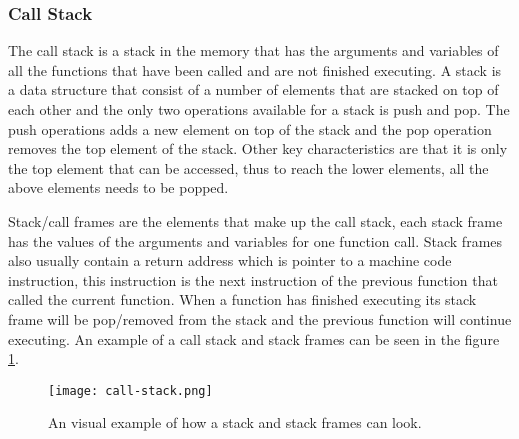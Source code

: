 \subsubsection{Call Stack}
The call stack is a stack in the memory that has the arguments and variables of all the functions that have been called and are not finished executing.
A stack is a data structure that consist of a number of elements that are stacked on top of each other and the only two operations available for a stack is push and pop.
The push operations adds a new element on top of the stack and the pop operation removes the top element of the stack.
Other key characteristics are that it is only the top element that can be accessed, thus to reach the lower elements, all the above elements needs to be popped.


Stack/call frames are the elements that make up the call stack, each stack frame has the values of the arguments and variables for one function call.
Stack frames also usually contain a return address which is pointer to a machine code instruction, this instruction is the next instruction of the previous function that called the current function.
When a function has finished executing its stack frame will be pop/removed from the stack and the previous function will continue executing. 
An example of a call stack and stack frames can be seen in the figure \ref{fig:callstack}.


\begin{figure}[h]
	\centering
	\texttt{[image: call-stack.png]}
	\caption{An visual example of how a stack and stack frames can look.}
	\label{fig:callstack}
\end{figure}



